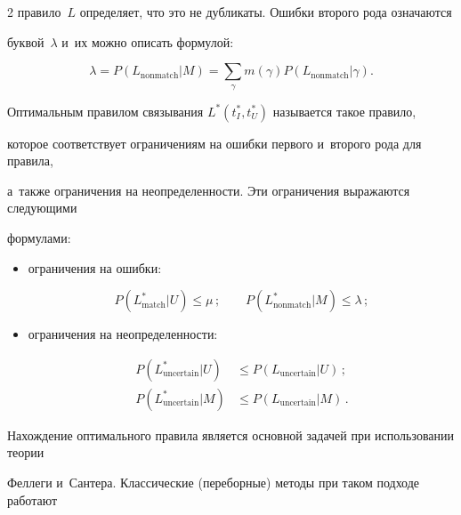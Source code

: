\begin{multicols}{2}
правило~$L$ определяет, что это не дубликаты. Ошибки второго рода означаются

буквой~$\lambda$ и~их можно описать формулой:

  $$

  \lambda= P(L_{\mathrm{nonmatch}}\vert M) =

  \sum\limits_\gamma m(\gamma) P\left(

L_{\mathrm{nonmatch}} \vert \gamma\right).

  $$



  Оптимальным правилом связывания $L^*(t_I^*,t_U^*)$ называется такое правило,

которое соответствует ограничениям на ошибки первого и~второго рода для правила,

  а~так\-же ограничения на неопределенности. Эти ограничения выражаются следующими

формулами:

\begin{itemize}

\item

  ограничения на ошибки:

  $$

  P\left( L^*_{\mathrm{match}}\vert U\right) \leq \mu\,;\qquad

  P\left( L^*_{\mathrm{nonmatch}}\vert M\right) \leq

\lambda\,;

  $$

\item

  ограничения на неопределенности:

  \begin{align*}

  P\left( L^*_{\mathrm{uncertain}}\vert U\right) &\leq P\left( L_{\mathrm{uncertain}} \vert U\right)\,;\\

  P\left( L^*_{\mathrm{uncertain}} \vert M\right)&\leq P\left( L_{\mathrm{uncertain}}\vert M\right)\,.

\end{align*}

\end{itemize}



  Нахождение оптимального правила является основной задачей при использовании теории

Феллеги и~Сантера. Классические (переборные) методы при таком подходе работают


\end{multicols}
